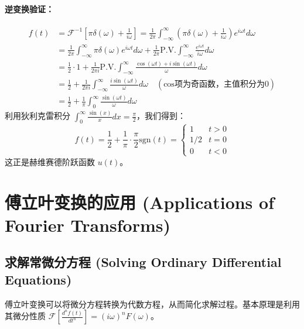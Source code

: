 \documentclass{article}
\begin{document}
	\paragraph{逆变换验证：}
	\begin{align*}
		f(t) &= \mathcal{F}^{-1}\left[\pi\delta(\omega) + \frac{1}{i\omega}\right] = \frac{1}{2\pi} \int_{-\infty}^{\infty} \left(\pi\delta(\omega) + \frac{1}{i\omega}\right) e^{i\omega t} d\omega \\
		&= \frac{1}{2\pi} \int_{-\infty}^{\infty} \pi\delta(\omega)e^{i\omega t}d\omega + \frac{1}{2\pi} \text{P.V.} \int_{-\infty}^{\infty} \frac{e^{i\omega t}}{i\omega} d\omega \\
		&= \frac{1}{2} \cdot 1 + \frac{1}{2\pi i} \text{P.V.} \int_{-\infty}^{\infty} \frac{\cos(\omega t)+i\sin(\omega t)}{\omega} d\omega \\
		&= \frac{1}{2} + \frac{1}{2\pi i} \int_{-\infty}^{\infty} \frac{i\sin(\omega t)}{\omega} d\omega \quad (\text{cos项为奇函数，主值积分为0}) \\
		&= \frac{1}{2} + \frac{1}{\pi} \int_{0}^{\infty} \frac{\sin(\omega t)}{\omega} d\omega
	\end{align*}
	利用狄利克雷积分 $\int_0^\infty \frac{\sin(x)}{x}dx = \frac{\pi}{2}$，我们得到：
	$$ 
	f(t) = \frac{1}{2} + \frac{1}{\pi} \cdot \frac{\pi}{2} \text{sgn}(t) = \begin{cases} 1 & t>0 \\ 1/2 & t=0 \\ 0 & t<0 \end{cases} 
	$$
	这正是赫维赛德阶跃函数 $u(t)$。
	
	\section{傅立叶变换的应用 (Applications of Fourier Transforms)}
	
	\subsection{求解常微分方程 (Solving Ordinary Differential Equations)}
	傅立叶变换可以将微分方程转换为代数方程，从而简化求解过程。基本原理是利用其微分性质 $\mathcal{F}[\frac{d^n f(t)}{dt^n}] = (i\omega)^n F(\omega)$。
	
\end{document}
